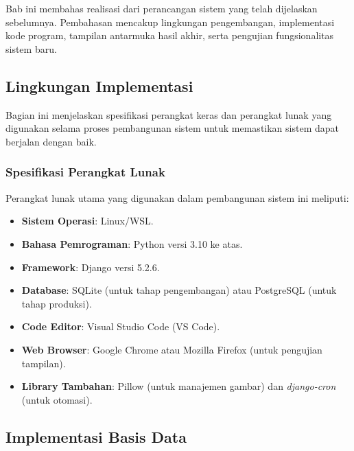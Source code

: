 \chapter{\babTiga}
Bab ini membahas realisasi dari perancangan sistem yang telah dijelaskan sebelumnya. Pembahasan mencakup lingkungan pengembangan, implementasi kode program, tampilan antarmuka hasil akhir, serta pengujian fungsionalitas sistem baru.

\section{Lingkungan Implementasi}

Bagian ini menjelaskan spesifikasi perangkat keras dan perangkat lunak yang digunakan selama proses pembangunan sistem untuk memastikan sistem dapat berjalan dengan baik.

\subsection{Spesifikasi Perangkat Lunak}

Perangkat lunak utama yang digunakan dalam pembangunan sistem ini meliputi:

\begin{itemize}
    \item \textbf{Sistem Operasi}: Linux/WSL.
    \item \textbf{Bahasa Pemrograman}: Python versi 3.10 ke atas.
    \item \textbf{Framework}: Django versi 5.2.6.
    \item \textbf{Database}: SQLite (untuk tahap pengembangan) atau PostgreSQL (untuk tahap produksi).
    \item \textbf{Code Editor}: Visual Studio Code (VS Code).
    \item \textbf{Web Browser}: Google Chrome atau Mozilla Firefox (untuk pengujian tampilan).
    \item \textbf{Library Tambahan}: Pillow (untuk manajemen gambar) dan \textit{django-cron} (untuk otomasi).
\end{itemize}

\section{Implementasi Basis Data}

